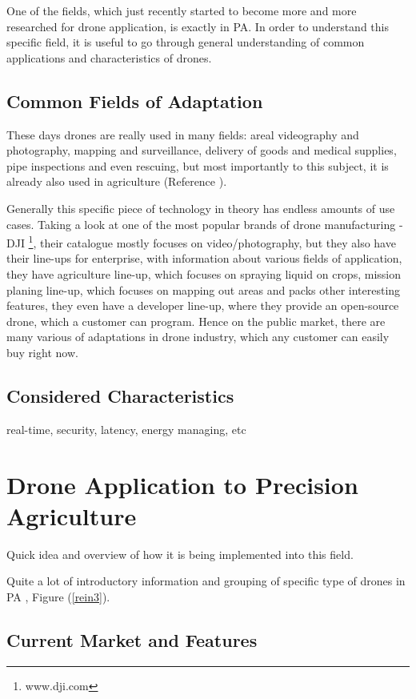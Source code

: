 \documentclass[11pt,a5paper,footinclude=true,headinclude=true, oneside]{scrbook}
\begin{document}
One of the fields, which just recently started to become more and more researched for drone application, is exactly in PA. In order to understand this specific field, it is useful to go through general understanding of common applications and characteristics of drones.

\section{Common Fields of Adaptation}

These days drones are really used in many fields: areal videography and photography, mapping and surveillance, delivery of goods and medical supplies, pipe inspections and even rescuing, but most importantly to this subject, it is already also used in agriculture (Reference \cite{alwateer_enabling_2019}). 

Generally this specific piece of technology in theory has endless amounts of use cases. Taking a look at one of the most popular brands of drone manufacturing - DJI \footnote{www.dji.com}, their catalogue mostly focuses on video/photography, but they also have their line-ups for enterprise, with information about various fields of application, they have agriculture line-up, which focuses on spraying liquid on crops, mission planing line-up, which focuses on mapping out areas and packs other interesting features, they even have a developer line-up, where they provide an open-source drone, which a customer can program. Hence on the public market, there are many various of adaptations in drone industry, which any customer can easily buy right now.

\section{Considered Characteristics}

real-time, security, latency, energy managing, etc


\chapter{Drone Application to Precision Agriculture}
Quick idea and overview of how it is being implemented into this field.
    
Quite a lot of introductory information and grouping of specific type of drones in PA \cite{Bacco_Smart_2018}, Figure (\ref{rein3}).
    
\section{Current Market and Features}
\end{document}

